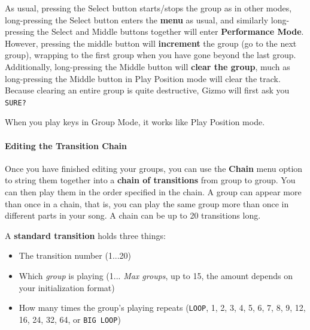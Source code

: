 \documentclass{article}
\begin{document}
As usual, pressing the Select button starts/stops the group as in other modes, long-pressing the Select button enters the {\bf menu} as usual, and similarly long-pressing the Select and Middle buttons together will enter {\bf Performance Mode}.  However, pressing the middle button will {\bf increment} the group (go to the next group), wrapping to the first group when you have gone beyond the last group.  Additionally, long-pressing the Middle button will {\bf clear the group}, much as long-pressing the Middle button in Play Position mode will clear the track.  Because clearing an entire group is quite destructive, Gizmo will first ask you {\tt SURE?}


When you play keys in Group Mode, it works like Play Position mode.

\paragraph{Editing the Transition Chain}

Once you have finished editing your groups, you can use the {\bf Chain} menu option to string them together into a {\bf chain of transitions} from group to group.  You can then play them in the order specified in the chain.   A group can appear more than once in a chain, that is, you can play the same group more than once in different parts in your song.  A chain can be up to 20 transitions long.

A {\bf standard transition} holds three things:

\begin{itemize}
\item The transition number (1...20)
\item Which {\it group} is playing (1... {\it Max groups}, up to 15, the amount depends on your initialization format)
\item How many times the group's playing repeats (\texttt{LOOP}, 1, 2, 3, 4, 5, 6, 7, 8, 9, 12, 16, 24, 32, 64, or \texttt{BIG~LOOP})
\end{itemize}
\end{document}
